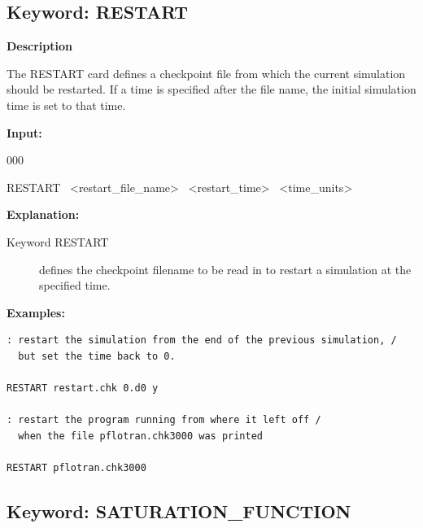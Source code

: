 \documentclass[12pt]{article}
\begin{document}
\subsection{Keyword: RESTART}
{\noindent\bf Description}

The RESTART card defines a checkpoint file from which the current simulation should be restarted.  If a time is specified after the file name, the initial simulation time is set to that time.

{\noindent\bf Input:}

\begin{deflist}{000}
\item[RESTART] \ <restart\_file\_name> \ <restart\_time> \ <time\_units>
\end{deflist}

{\noindent\bf Explanation:}
\begin{description}
\item[Keyword RESTART] defines the checkpoint filename to be read in to restart a simulation at the specified time.
\end{description}

{\noindent\bf
Examples:}

\begin{mdframed}

\begin{verbatim}
: restart the simulation from the end of the previous simulation, /
  but set the time back to 0.

RESTART restart.chk 0.d0 y

: restart the program running from where it left off /
  when the file pflotran.chk3000 was printed

RESTART pflotran.chk3000

\end{verbatim}

\end{mdframed}

\hyperlink{target_key}{\return}


\newpage
\protect\hypertarget{target_sat}{}

\subsection{Keyword: SATURATION\_FUNCTION}
\end{document}
